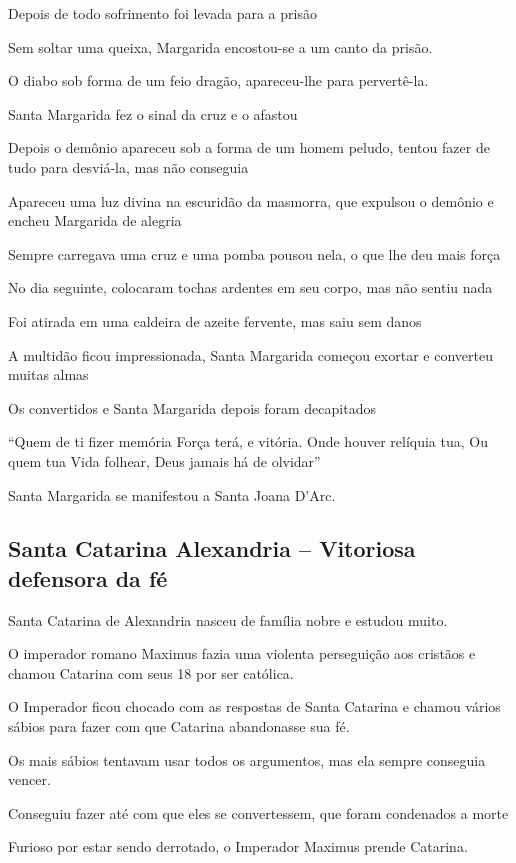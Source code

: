 \documentclass[a4paper,12pt]{extarticle} \usepackage[utf8]{inputenc}
\begin{document}
Depois de todo sofrimento foi levada para a prisão

Sem soltar uma queixa, Margarida encostou-se a um canto da prisão.

O diabo sob forma de um feio dragão, apareceu-lhe para pervertê-la.

Santa Margarida fez o  sinal da cruz e o afastou

Depois o demônio apareceu sob a forma de um homem peludo, tentou fazer de tudo para desviá-la, mas não conseguia

Apareceu uma luz divina na escuridão da masmorra, que expulsou o demônio e encheu Margarida de alegria

Sempre carregava uma cruz e uma pomba pousou nela, o que lhe deu mais força

No dia seguinte, colocaram tochas ardentes em seu corpo, mas não sentiu nada

Foi atirada em uma caldeira de azeite fervente, mas saiu sem danos

A multidão ficou impressionada, Santa Margarida começou exortar e converteu muitas almas

Os convertidos e Santa Margarida depois foram decapitados


“Quem de ti fizer memória
Força terá, e vitória.
Onde houver relíquia tua,
Ou quem tua Vida folhear,
Deus jamais há de olvidar”


Santa Margarida se manifestou a Santa Joana D'Arc.
 
\subsection{Santa Catarina Alexandria – Vitoriosa defensora da fé}

Santa Catarina de Alexandria nasceu de família nobre e estudou muito.

O imperador romano Maximus fazia uma violenta perseguição aos cristãos e chamou Catarina com seus 18 por ser católica.

O Imperador ficou chocado com as respostas de Santa Catarina e chamou vários sábios para fazer com que Catarina abandonasse sua fé.

Os mais sábios tentavam usar todos os argumentos, mas ela sempre conseguia vencer.

Conseguiu fazer até com que eles se convertessem, que foram condenados a morte

 

Furioso por estar sendo derrotado, o Imperador Maximus prende Catarina.
\end{document}
